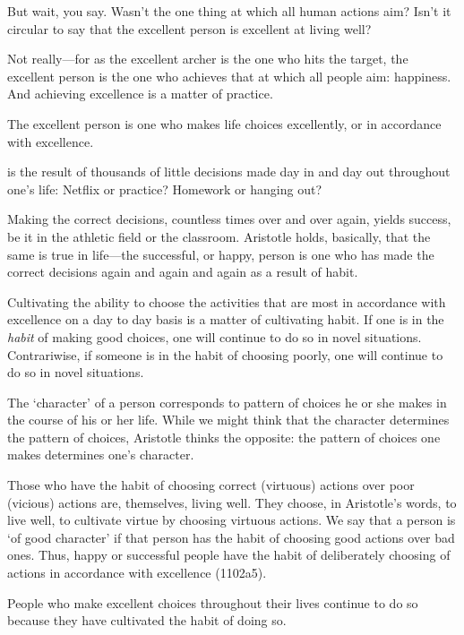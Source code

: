 But wait, you say. Wasn't the one thing at which all human actions aim? Isn't it circular to say that the excellent person is excellent at living well? 

Not really---for as the excellent archer is the one who hits the target, the excellent person is the one who achieves that at which all people aim: happiness. And achieving excellence is a matter of practice.
\begin{thesis}\label{thesis:aristotle2}
The excellent person is one who makes life choices excellently, or in accordance with excellence.  
\end{thesis}

 is the result of thousands of little decisions made day in and day out throughout one's life: Netflix or practice? Homework or hanging out? 

Making the correct decisions, countless times over and over again, yields success, be it in the athletic field or the classroom. Aristotle holds, basically, that the same is true in life---the successful, or happy, person is one who has made the correct decisions again and again and again as a result of habit.

Cultivating the ability to choose the activities that are most in accordance with excellence on a day to day basis is a matter of cultivating habit. If one is in the \emph{habit} of making good choices, one will continue to do so in novel situations. Contrariwise, if someone is in the habit of choosing poorly, one will continue to do so in novel situations.

The `character' of a person corresponds to pattern of choices he or she makes in the course of his or her life. While we might think that the character determines the pattern of choices, Aristotle thinks the opposite: the pattern of choices one makes determines one's character. 

Those who have the habit of choosing correct (virtuous) actions over poor (vicious) actions are, themselves, living well. They choose, in Aristotle's words, to live well, to cultivate virtue by choosing virtuous actions. We say that a person is `of good character' if that person has the habit of choosing good actions over bad ones. Thus, happy or successful people have the habit of deliberately choosing of actions in accordance with excellence (1102a5). 
\begin{thesis}\label{thesis:aristotle3}
People who make excellent choices throughout their lives continue to do so because they have cultivated the habit of doing so.
\end{thesis}

